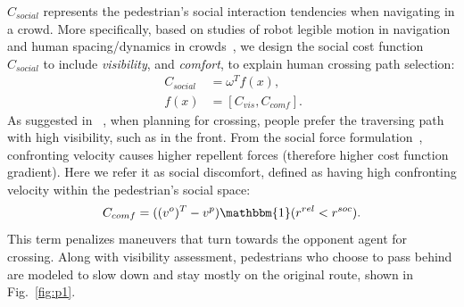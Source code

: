 \documentclass[conference]{IEEEtran}
\begin{document}
$C_{social}$ represents the pedestrian's social interaction tendencies when 
navigating in a crowd. More specifically, based on
studies of robot legible motion in 
navigation~\cite{kruse2012legible,lichtenthaler2012influence} and human 
spacing/dynamics in crowds~\cite{helbing1995social,hall1966hidden}, we design 
the social cost function $C_{social}$ to include \textit{visibility}, and \textit{comfort}, 
to explain human crossing path selection:
\begin{equation}~\label{eq:social_cost}
  \begin{aligned}
    C_{social} &= \omega^T f(x), \\
    f(x) &= [C_{vis}, C_{comf}].
  \end{aligned}
\end{equation}
As suggested in ~\cite{kruse2012legible}, when planning for crossing, people 
prefer the traversing path with high visibility, such as in the front.
From the social force formulation~\cite{helbing1995social}, confronting 
velocity 
causes higher repellent forces (therefore higher cost function 
gradient). 
Here we refer it as social discomfort, defined as having high 
confronting velocity within the pedestrian's social space:
\begin{equation}
  C_{comf} = ((v^o)^T -v^p) \mathbbm{1}(r^{rel}<r^{soc}).
\end{equation}
This term penalizes maneuvers that turn towards the opponent agent for 
crossing.
Along with visibility assessment, pedestrians who choose to pass 
behind are modeled to slow down and stay mostly on the original route, shown 
in Fig.~\ref{fig:p1}.
\end{document}

